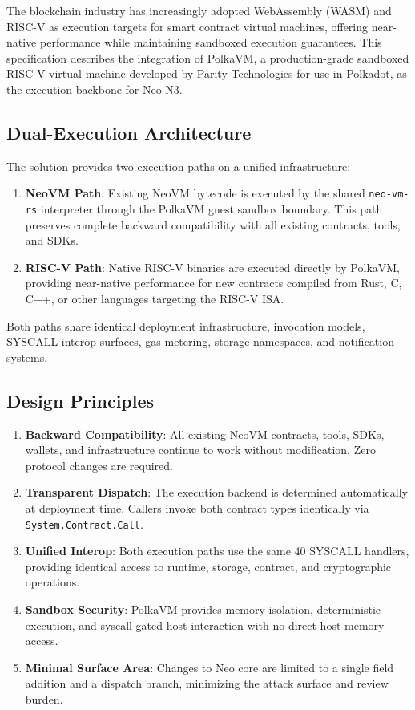 \documentclass[11pt,a4paper]{article}
\begin{document}
The blockchain industry has increasingly adopted WebAssembly (WASM) and RISC-V
as execution targets for smart contract virtual machines, offering near-native
performance while maintaining sandboxed execution guarantees. This
specification describes the integration of PolkaVM, a production-grade
sandboxed RISC-V virtual machine developed by Parity Technologies for use in
Polkadot, as the execution backbone for Neo N3.

\subsection{Dual-Execution Architecture}

The solution provides two execution paths on a unified infrastructure:

\begin{enumerate}[noitemsep]
    \item \textbf{NeoVM Path}: Existing NeoVM bytecode is executed by the
          shared \texttt{neo-vm-rs} interpreter through the PolkaVM guest
          sandbox boundary. This path preserves complete backward compatibility with
          all existing contracts, tools, and SDKs.
    \item \textbf{RISC-V Path}: Native RISC-V binaries are executed directly
          by PolkaVM, providing near-native performance for new contracts
          compiled from Rust, C, C++, or other languages targeting the
          RISC-V ISA.
\end{enumerate}

Both paths share identical deployment infrastructure, invocation models,
SYSCALL interop surfaces, gas metering, storage namespaces, and notification
systems.

\subsection{Design Principles}

\begin{enumerate}[noitemsep]
    \item \textbf{Backward Compatibility}: All existing NeoVM contracts,
          tools, SDKs, wallets, and infrastructure continue to work without
          modification. Zero protocol changes are required.
    \item \textbf{Transparent Dispatch}: The execution backend is determined
          automatically at deployment time. Callers invoke both contract types
          identically via \texttt{System.Contract.Call}.
    \item \textbf{Unified Interop}: Both execution paths use the same 40
          SYSCALL handlers, providing identical access to runtime, storage,
          contract, and cryptographic operations.
    \item \textbf{Sandbox Security}: PolkaVM provides memory isolation,
          deterministic execution, and syscall-gated host interaction with
          no direct host memory access.
    \item \textbf{Minimal Surface Area}: Changes to Neo core are limited to
          a single field addition and a dispatch branch, minimizing the
          attack surface and review burden.
\end{enumerate}
\end{document}
